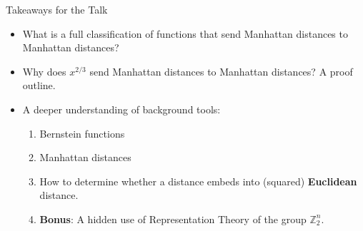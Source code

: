 \begin{frame}{Takeaways for the Talk}
  \begin{itemize}
  \item What is a full classification of functions that send Manhattan
  distances to Manhattan distances?
  \item {\color{blue}Why does $x^{2/3}$ send Manhattan distances to Manhattan
    distances? A proof outline.}
  \item A deeper understanding of background tools:
  \begin{enumerate} 
  \item Bernstein functions
  \item Manhattan distances
  \item How to determine whether a distance embeds into (squared)
  \textbf{Euclidean} distance.
  \item \textbf{Bonus}: A hidden use of Representation Theory of the
  group $\mathbb{Z}_2^n$.

  \end{enumerate}
  \end{itemize}
\end{frame}

